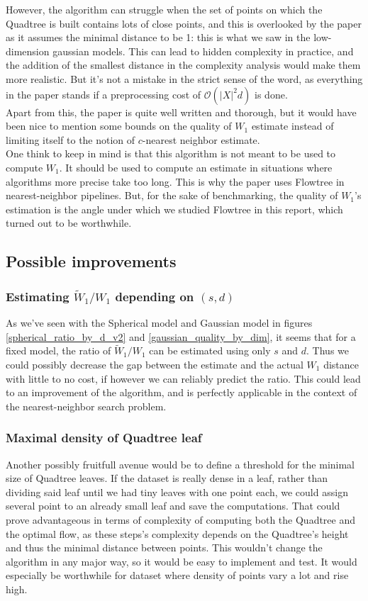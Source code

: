 \documentclass[11pt]{article}
\begin{document}
However, the algorithm can struggle when the set of points on which the Quadtree is built contains lots of close points, and this is overlooked by the paper as it assumes the minimal distance to be 1: this is what we saw in the low-dimension gaussian models. This can lead to hidden complexity in practice, and the addition of the smallest distance in the complexity analysis would make them more realistic. But it's not a mistake in the strict sense of the word, as everything in the paper stands if a preprocessing cost of $\mathcal{O}(\vert X \vert^2 d)$ is done.\\
Apart from this, the paper is quite well written and thorough, but it would have been nice to mention some bounds on the quality of $W_1$ estimate instead of limiting itself to the notion of $c$-nearest neighbor estimate.\\

One think to keep in mind is that this algorithm is not meant to be used to compute $W_1$. It should be used to compute an estimate in situations where algorithms more precise take too long. This is why the paper uses Flowtree in nearest-neighbor pipelines. But, for the sake of benchmarking, the quality of $W_1$'s estimation is the angle under which we studied Flowtree in this report, which turned out to be worthwhile.

\subsection{Possible improvements}

\subsubsection{Estimating $\widetilde{W}_1 / W_1$ depending on $(s, d)$}
As we've seen with the Spherical model and Gaussian model in figures \ref{spherical_ratio_by_d_v2} and \ref{gaussian_quality_by_dim}, it seems that for a fixed model, the ratio of $\widetilde{W}_1 / W_1$ can be estimated using only $s$ and $d$. Thus we could possibly decrease the gap between the estimate and the actual $W_1$ distance with little to no cost, if however we can reliably predict the ratio. This could lead to an improvement of the algorithm, and is perfectly applicable in the context of the nearest-neighbor search problem. 

\subsubsection{Maximal density of Quadtree leaf}
Another possibly fruitfull avenue would be to define a threshold for the minimal size of Quadtree leaves. If the dataset is really dense in a leaf, rather than dividing said leaf until we had tiny leaves with one point each, we could assign several point to an already small leaf and save the computations. That could prove advantageous in terms of complexity of computing both the Quadtree and the optimal flow, as these steps's complexity depends on the Quadtree's height and thus the minimal distance between points. This wouldn't change the algorithm in any major way, so it would be easy to implement and test. It would especially be worthwhile for dataset where density of points vary a lot and rise high.
\end{document}
